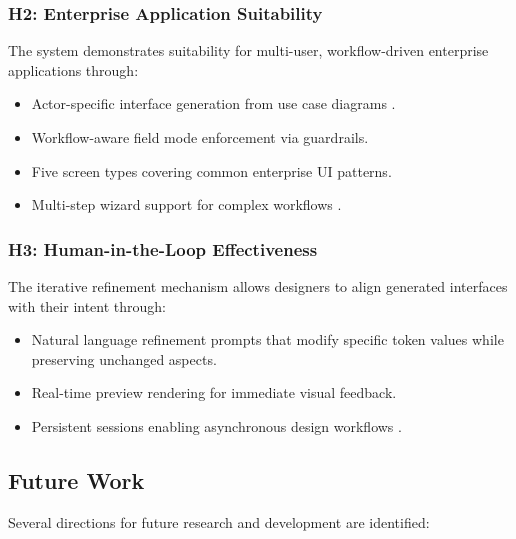 \subsubsection{H2: Enterprise Application Suitability}

The system demonstrates suitability for multi-user, workflow-driven enterprise applications through:
\begin{itemize}
    \item Actor-specific interface generation from use case diagrams \cite{Wil24}.
    \item Workflow-aware field mode enforcement via guardrails.
    \item Five screen types covering common enterprise UI patterns.
    \item Multi-step wizard support for complex workflows \cite{vA22}.
\end{itemize}

\subsubsection{H3: Human-in-the-Loop Effectiveness}

The iterative refinement mechanism allows designers to align generated interfaces with their intent through:
\begin{itemize}
    \item Natural language refinement prompts that modify specific token values while preserving unchanged aspects.
    \item Real-time preview rendering for immediate visual feedback.
    \item Persistent sessions enabling asynchronous design workflows \cite{dH24}.
\end{itemize}


\subsection{Future Work}

Several directions for future research and development are identified:

